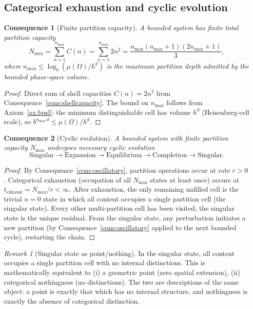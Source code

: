\documentclass[11pt,twocolumn,a4paper]{article}
\theoremstyle{axiomstyle}
\theoremstyle{conseqstyle}
\newtheorem{consequence}{Consequence}
\theoremstyle{definition}
\theoremstyle{remark}
\newtheorem*{remark}{Remark}
\newcommand{\Nmax}{N_{\mathrm{max}}}
\begin{document}
\subsection{Categorical exhaustion and cyclic evolution}

\begin{consequence}[Finite partition capacity]\label{cons:finitecapacity}
A bounded system has finite total partition capacity
\begin{equation}
\Nmax=\sum_{n=1}^{n_{\max}}C(n)=\sum_{n=1}^{n_{\max}}2n^{2}=\frac{n_{\max}(n_{\max}+1)(2n_{\max}+1)}{3},
\end{equation}
where $n_{\max}\leq\log_{b}(\mu(\Omega)/h^{d})$ is the maximum partition depth admitted by the bounded phase-space volume.
\end{consequence}

\begin{proof}
Direct sum of shell capacities $C(n)=2n^{2}$ from Consequence~\ref{cons:shellcapacity}. The bound on $n_{\max}$ follows from Axiom~\ref{ax:bpsl}: the minimum distinguishable cell has volume $h^{d}$ (Heisenberg-cell scale), so $b^{n_{\max}\,d}\leq\mu(\Omega)/h^{d}$.
\end{proof}

\begin{consequence}[Cyclic evolution]\label{cons:cyclic}
A bounded system with finite partition capacity $\Nmax$ undergoes necessary cyclic evolution
\begin{equation}
\mathrm{Singular}\to\mathrm{Expansion}\to\mathrm{Equilibrium}\to\mathrm{Completion}\to\mathrm{Singular}.
\end{equation}
\end{consequence}

\begin{proof}
By Consequence~\ref{cons:oscillatory}, partition operations occur at rate $r>0$. Categorical exhaustion (occupation of all $\Nmax$ states at least once) occurs at $t_{\mathrm{exhaust}}=\Nmax/r<\infty$. After exhaustion, the only remaining unfilled cell is the trivial $n=0$ state in which all content occupies a single partition cell (the singular state). Every other multi-partition cell has been visited; the singular state is the unique residual. From the singular state, any perturbation initiates a new partition (by Consequence~\ref{cons:oscillatory} applied to the next bounded cycle), restarting the chain.
\end{proof}

\begin{remark}[Singular state as point/nothing]
In the singular state, all content occupies a single partition cell with no internal distinctions. This is mathematically equivalent to (i) a geometric point (zero spatial extension), (ii) categorical nothingness (no distinctions). The two are descriptions of the same object: a point is exactly that which has no internal structure, and nothingness is exactly the absence of categorical distinction.
\end{remark}
\end{document}
